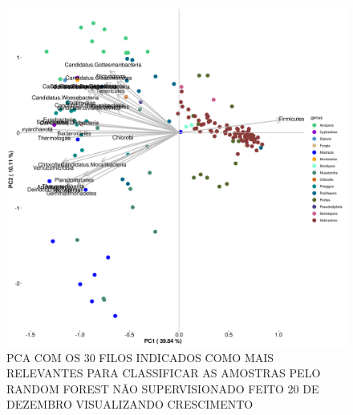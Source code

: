 \documentclass[12pt, a4paper]{report}
\begin{document}
\begin{figure}[H]
	\centering
	\includegraphics[scale=0.4]{figures/PCA_rf_nao_super_30_157_corais_genus_2018_12_20.png}
	\caption{PCA COM OS 30 FILOS INDICADOS COMO MAIS RELEVANTES PARA CLASSIFICAR AS AMOSTRAS PELO RANDOM FOREST NÃO SUPERVISIONADO FEITO 20 DE DEZEMBRO VISUALIZANDO CRESCIMENTO}
	\label{fig: PCA COM OS 30 FILOS INDICADOS COMO MAIS RELEVANTES PARA CLASSIFICAR AS AMOSTRAS PELO RANDOM FOREST NÃO SUPERVISIONADO FEITO 20 DE DEZEMBRO VISUALIZANDO CRESCIMENTO}
\end{figure}
\end{document}
